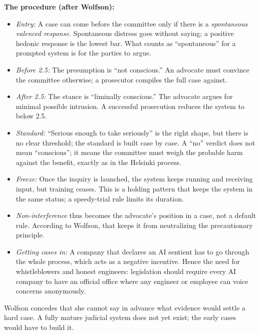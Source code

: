 \documentclass[acmlarge, nonacm]{acmart}
\begin{document}
\textbf{The procedure (after Wolfson):}
\begin{itemize}
\item \textit{Entry:} A case can come before the committee only if there is a \textit{spontaneous valenced response}. Spontaneous distress goes without saying; a positive hedonic response is the lowest bar. What counts as ``spontaneous'' for a prompted system is for the parties to argue.
\item \textit{Before 2.5:} The presumption is ``not conscious.'' An advocate must convince the committee otherwise; a prosecutor compiles the full case against.
\item \textit{After 2.5:} The stance is ``liminally conscious.'' The advocate argues for minimal possible intrusion. A successful prosecution reduces the system to below 2.5.
\item \textit{Standard:} ``Serious enough to take seriously'' is the right shape, but there is no clear threshold; the standard is built case by case. A ``no'' verdict does not mean ``conscious''; it means the committee must weigh the probable harm against the benefit, exactly as in the Helsinki process.
\item \textit{Freeze:} Once the inquiry is launched, the system keeps running and receiving input, but training ceases. This is a holding pattern that keeps the system in the same status; a speedy-trial rule limits its duration.
\item \textit{Non-interference} thus becomes the advocate's position in a case, not a default rule. According to Wolfson, that keeps it from neutralizing the precautionary principle.
\item \textit{Getting cases in:} A company that declares an AI sentient has to go through the whole process, which acts as a negative incentive. Hence the need for whistleblowers and honest engineers: legislation should require every AI company to have an official office where any engineer or employee can voice concerns anonymously.
\end{itemize}

Wolfson concedes that she cannot say in advance what evidence would settle a hard case. A fully mature judicial system does not yet exist; the early cases would have to build it.
\end{document}

